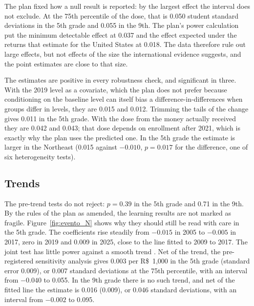 \documentclass[11pt]{article}
\newcommand{\reais}{R\$}
\begin{document}
\begin{table}[t]
\centering
\caption{Learning (P2 and S1)}\label{tab:aprendizagem}
\small

\end{table}

The plan fixed how a null result is reported: by the largest effect the interval does not exclude. At the 75th percentile of the dose, that is 0.050 student standard deviations in the 5th grade and 0.055 in the 9th. The plan's power calculation put the minimum detectable effect at 0.037 and the effect expected under the returns that \citet{jackson2024} estimate for the United States at 0.018. The data therefore rule out large effects, but not effects of the size the international evidence suggests, and the point estimates are close to that size.

The estimates are positive in every robustness check, and significant in three. With the 2019 level as a covariate, which the plan does not prefer because conditioning on the baseline level can itself bias a difference-in-differences when groups differ in levels, they are 0.015 and 0.012. Trimming the tails of the change gives 0.011 in the 5th grade. With the dose from the money actually received they are 0.042 and 0.043; that dose depends on enrollment after 2021, which is exactly why the plan uses the predicted one. In the 5th grade the estimate is larger in the Northeast (0.015 against $-0.010$, $p=0.017$ for the difference, one of six heterogeneity tests).

\subsection{Trends}

The pre-trend tests do not reject: $p=0.39$ in the 5th grade and 0.71 in the 9th. By the rules of the plan as amended, the learning results are not marked as fragile. Figure~\ref{fig:evento_N} shows why they should still be read with care in the 5th grade. The coefficients rise steadily from $-0.015$ in 2005 to $-0.005$ in 2017, zero in 2019 and 0.009 in 2025, close to the line fitted to 2009 to 2017. The joint test has little power against a smooth trend \citep{roth2022}. Net of the trend, the pre-registered sensitivity analysis gives 0.003 per \reais{}~1,000 in the 5th grade (standard error 0.009), or 0.007 standard deviations at the 75th percentile, with an interval from $-0.040$ to 0.055. In the 9th grade there is no such trend, and net of the fitted line the estimate is 0.016 (0.009), or 0.046 standard deviations, with an interval from $-0.002$ to 0.095.
\end{document}
